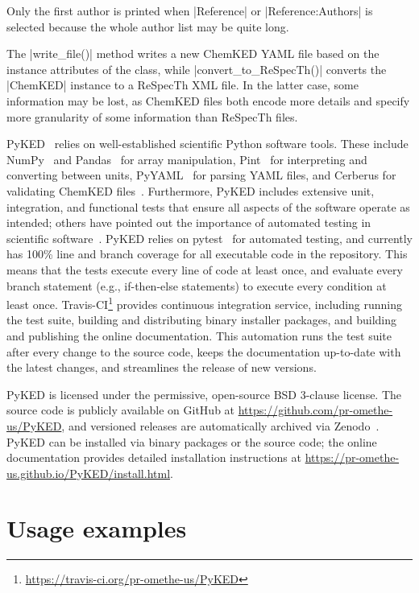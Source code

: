 \documentclass[12pt]{ijck}
\newcommand\ck{ChemKED}
\newcommand\pk{PyKED}
\begin{document}
Only the first author is printed when \pybox|Reference| or
\pybox|Reference:Authors| is selected because the whole author list may be
quite long.

The \pybox|write_file()| method writes a new \ck{} YAML file based on the instance attributes
of the class, while \pybox|convert_to_ReSpecTh()| converts the \pybox|ChemKED|
instance to a ReSpecTh XML file. In the latter case, some information may be lost, as \ck{}
files both encode more details and specify more granularity of some information than
ReSpecTh files.

\pk{}~\autocite{PyKED} relies on well-established scientific Python software tools.
These include NumPy~\autocite{vanderWalt:2011np} and Pandas~\autocite{pandas,McKinney2010}
for array manipulation, Pint~\autocite{Grecco2016} for interpreting and converting
between units, PyYAML~\autocite{pyyaml} for parsing YAML
files, and Cerberus for validating \ck{} files~\autocite{cerberus}.
Furthermore, \pk{} includes extensive unit, integration, and functional tests
that ensure all aspects of the software operate as intended; others have pointed
out the importance of automated testing in scientific software~\autocite{Wilson:bestpractices}.
\pk{} relies on pytest~\autocite{pytest:3.0.1} for automated testing, and currently has
100\% line and branch coverage for all executable code in the repository. This
means that the tests execute every line of code at least once, and evaluate
every branch statement (e.g., if-then-else statements) to execute every condition
at least once.
Travis-CI\footnote{\url{https://travis-ci.org/pr-omethe-us/PyKED}} provides continuous
integration service, including running the test suite, building and distributing binary
installer packages, and building and publishing the online documentation. This automation
runs the test suite after every change to the source code, keeps the documentation
up-to-date with the latest changes, and streamlines the release of new versions.

\pk{} is licensed under the permissive, open-source BSD 3-clause license. The
source code is publicly available on GitHub at \url{https://github.com/pr-omethe-us/PyKED},
and versioned releases are automatically archived via Zenodo~\autocite{PyKED}.
\pk{} can be installed via binary packages or the source code; the online documentation
provides detailed installation instructions at
\url{https://pr-omethe-us.github.io/PyKED/install.html}.

\section{Usage examples}\label{sec:usage-example}
\end{document}
